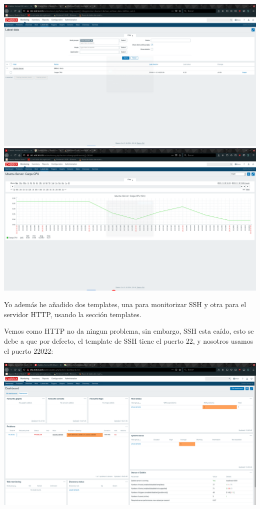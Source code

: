 \documentclass[12pt, spanish]{article}
\begin{document}
\begin{center}
\includegraphics[scale=0.25]{item_1.png}
\includegraphics[scale=0.25]{item_2.png}
\end{center}

Yo además he añadido dos templates, una para monitorizar SSH y otra para el servidor HTTP, usando la sección templates.

\newpage

Vemos como HTTP no da ningun problema, sin embargo, SSH esta caído, esto se debe a que por defecto, el template de SSH tiene el puerto 22, y nosotros usamos el puerto 22022:
\begin{center}
\includegraphics[scale=0.25]{error_ssh.png}
\end{center}
\end{document}
